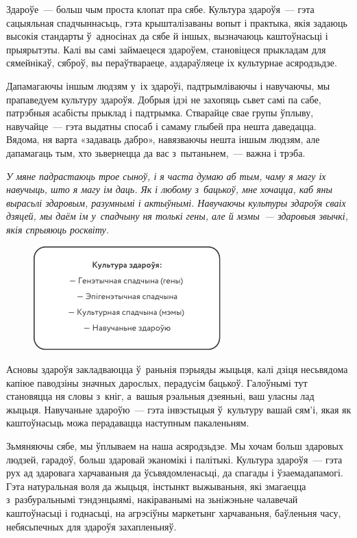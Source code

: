 Здароўе~--- больш чым проста клопат пра сябе. Культура здароўя~--- гэта сацыяльная спадчыннасьць, гэта крышталізаваны вопыт і практыка, якія задаюць высокія стандарты ў~адносінах да сябе й іншых, вызначаюць каштоўнасьці і прыярытэты. Калі вы самі займаецеся здароўем, становіцеся прыкладам для сямейнікаў, сяброў, вы пераўтвараеце, аздараўляеце іх культурнае асяродзьдзе.

Дапамагаючы іншым людзям у~іх здароўі, падтрымліваючы і навучаючы, мы прапаведуем культуру здароўя. Добрыя ідэі не захопяць сьвет самі па сабе, патрэбныя асабісты прыклад і падтрымка. Стварайце свае групы ўплыву, навучайце~--- гэта выдатны спосаб і самаму глыбей пра нешта даведацца. Вядома, ня варта «задаваць дабро», навязваючы нешта іншым людзям, але дапамагаць тым, хто зьвернецца да вас з~пытаньнем,~--- важна і трэба.

\emph{У мяне падрастаюць трое сыноў, і я часта думаю аб тым, чаму я магу іх навучыць, што я магу ім даць. Як і любому з~бацькоў, мне хочацца, каб яны вырасьлі здаровым, разумнымі і актыўнымі. Навучаючы культуры здароўя сваіх дзяцей, мы даём ім у~спадчыну ня толькі гены, але й мэмы~--- здаровыя звычкі, якія спрыяюць росквіту.}

\begin{figure}[htb!]
  \centering
  \includegraphics[scale=1.5]{willpower/ch1/7.pdf}
\end{figure}

Асновы здароўя закладваюцца ў~раньнія пэрыяды жыцьця, калі дзіця несьвядома капіюе паводзіны значных дарослых, перадусім бацькоў. Галоўнымі тут становяцца ня словы з~кніг, а~вашыя рэальныя дзеяньні, ваш уласны лад жыцьця. Навучаньне здароўю~--- гэта інвэстыцыя ў~культуру вашай сям'і, якая як каштоўнасьць можа перадавацца наступным пакаленьням.

Зьмяняючы сябе, мы ўплываем на наша асяродзьдзе. Мы хочам больш здаровых людзей, гарадоў, больш здаровай эканомікі і палітыкі. Культура здароўя~--- гэта рух ад здаровага харчаваньня да ўсьвядомленасьці, да спагады і ўзаемадапамогі. Гэта натуральная воля да жыцьця, інстынкт выжываньня, які змагаецца з~разбуральнымі тэндэнцыямі, накіраванымі на зьніжэньне чалавечай каштоўнасьці і годнасьці, на агрэсіўны маркетынг харчаваньня, баўленьня часу, небясьпечных для здароўя захапленьняў.

